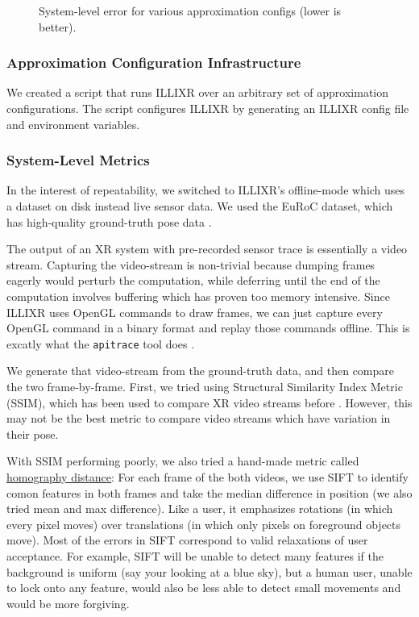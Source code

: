\begin{figure}
  \label{system-level-error}
  \caption{System-level error for various approximation configs (lower is better).}
\end{figure}

\subsubsection{Approximation Configuration Infrastructure}

We created a script that runs ILLIXR over an arbitrary set of approximation configurations. The script configures ILLIXR by generating an ILLIXR config file and environment variables. 

\subsubsection{System-Level Metrics}

In the interest of repeatability, we switched to ILLIXR's offline-mode which uses a dataset on disk instead live sensor data. We used the EuRoC dataset, which has high-quality ground-truth pose data \cite{Burri25012016}.

The output of an XR system with pre-recorded sensor trace is essentially a video stream. Capturing the video-stream is non-trivial because dumping frames eagerly would perturb the computation, while deferring until the end of the computation involves buffering which has proven too memory intensive. Since ILLIXR uses OpenGL commands to draw frames, we can just capture every OpenGL command in a binary format and replay those commands offline. This is excatly what the \verb+apitrace+ tool does \cite{apitrace}. 

We generate that video-stream from the ground-truth data, and then compare the two frame-by-frame. First, we tried using Structural Similarity Index Metric (SSIM), which has been used to compare XR video streams before . However, this may not be the best metric to compare video streams which have variation in their pose.

With SSIM performing poorly, we also tried a hand-made metric called \ul{homography distance}: For each frame of the both videos, we use SIFT to identify comon features in both frames  and take the median difference in position (we also tried mean and max difference). 
Like a user, it emphasizes rotations (in which every pixel moves) over translations (in which only pixels on foreground objects move). Most of the errors in SIFT correspond to valid relaxations of user acceptance. For example, SIFT will be unable to detect many features if the background is uniform (say your looking at a blue sky), but a human user, unable to lock onto any feature, would also be less able to detect small movements and would be more forgiving.

